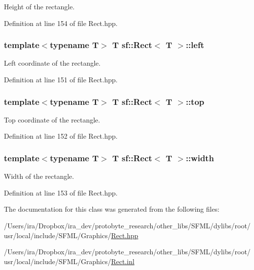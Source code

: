 Height of the rectangle. 



Definition at line 154 of file Rect.\-hpp.

\hypertarget{classsf_1_1_rect_aa49960fa465103d9cb7069ceb25c7c32}{
\subsubsection[{left}]{\setlength{\rightskip}{0pt plus 5cm}template$<$typename T$>$ T {\bf sf\-::\-Rect}$<$ T $>$\-::left}}\label{classsf_1_1_rect_aa49960fa465103d9cb7069ceb25c7c32}


Left coordinate of the rectangle. 



Definition at line 151 of file Rect.\-hpp.

\hypertarget{classsf_1_1_rect_abd3d3a2d0ad211ef0082bd0aa1a5c0e3}{
\subsubsection[{top}]{\setlength{\rightskip}{0pt plus 5cm}template$<$typename T$>$ T {\bf sf\-::\-Rect}$<$ T $>$\-::top}}\label{classsf_1_1_rect_abd3d3a2d0ad211ef0082bd0aa1a5c0e3}


Top coordinate of the rectangle. 



Definition at line 152 of file Rect.\-hpp.

\hypertarget{classsf_1_1_rect_a4dd5b9d4333bebbc51bd309298fd500f}{
\subsubsection[{width}]{\setlength{\rightskip}{0pt plus 5cm}template$<$typename T$>$ T {\bf sf\-::\-Rect}$<$ T $>$\-::{\bf width}}}\label{classsf_1_1_rect_a4dd5b9d4333bebbc51bd309298fd500f}


Width of the rectangle. 



Definition at line 153 of file Rect.\-hpp.



The documentation for this class was generated from the following files\-:\begin{DoxyCompactItemize}
\item 
/\-Users/ira/\-Dropbox/ira\-\_\-dev/protobyte\-\_\-research/other\-\_\-libs/\-S\-F\-M\-L/dylibs/root/usr/local/include/\-S\-F\-M\-L/\-Graphics/\hyperlink{_rect_8hpp}{Rect.\-hpp}\item 
/\-Users/ira/\-Dropbox/ira\-\_\-dev/protobyte\-\_\-research/other\-\_\-libs/\-S\-F\-M\-L/dylibs/root/usr/local/include/\-S\-F\-M\-L/\-Graphics/\hyperlink{_rect_8inl}{Rect.\-inl}\end{DoxyCompactItemize}
